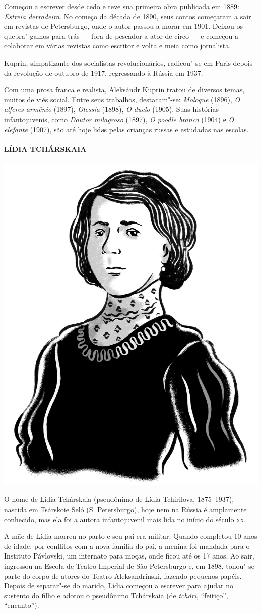 Começou a escrever desde cedo e teve sua primeira obra publicada em
1889: \emph{Estreia derradeira}. No começo da década de 1890, seus
contos começaram a sair em revistas de Petersburgo, onde o autor passou
a morar em 1901. Deixou os quebra"-galhos para trás --- fora de pescador
a ator de circo --- e começou a colaborar em várias revistas como
escritor e volta e meia como jornalista.

Kuprin, simpatizante dos socialistas revolucionários, radicou"-se em
Paris depois da revolução de outubro de 1917, regressando à Rússia em
1937.

Com uma prosa franca e realista, Aleksándr Kuprin tratou de diversos
temas, muitos de viés social. Entre seus trabalhos, destacam"-se:
\emph{Moloque} (1896), \emph{O alferes armênio} (1897), \emph{Olessia}
(1898), \emph{O duelo} (1905). Suas histórias infantojuvenis, como
\emph{Doutor milagroso} (1897), \emph{O poodle branco} (1904) е \emph{O
elefante} (1907), são até hoje lidаs pelas crianças russas e estudadas
nas escolas.

\paragraph{LÍDIA TCHÁRSKAIA}

\noindent\includegraphics[width=.8in]{./imgs/autor10.jpg}

\noindent{}O nome de Lídia Tchárskaia (pseudônimo de Lídia Tchirilova, 1875--1937),
nascida em Tsárskoie Seló (S. Petersburgo), hoje nem na Rússia é
amplamente conhecido, mas ela foi a autora infantojuvenil mais lida no
início do século \textsc{xx}.

A mãe de Lídia morreu no parto e seu pai era militar. Quando completou
10 anos de idade, por conflitos com a nova família do pai, a menina foi
mandada para o Instituto Pávlovski, um internato para moças, onde ficou
até os 17 anos. Ao sair, ingressou na Escola de Teatro Imperial de São
Petersburgo e, em 1898, tonou"-se parte do corpo de atores do Teatro
Aleksandrínski, fazendo pequenos papéis. Depois de separar"-se do marido,
Lídia começou a escrever para ajudar no sustento do filho e adotou o
pseudônimo Tchárskaia (de \emph{tchári}, ``feitiço'', ``encanto'').

